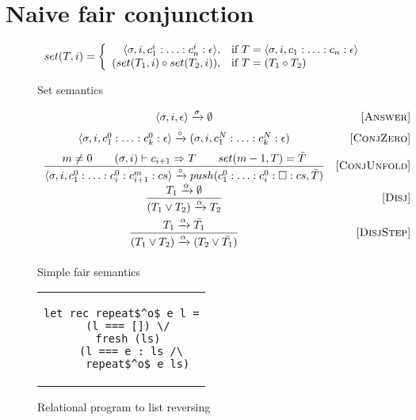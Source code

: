 \section{Naive fair conjunction}

\begin{figure}[h!]
\[
set(T, i) =
\left\{
\begin{array}{rl}
\langle \sigma, i, c_1^i : \ldots : c_n^i : \epsilon \rangle, & \mbox{if } T = \langle \sigma, i, c_1 : \ldots : c_n : \epsilon \rangle \\
(set(T_1, i) \circ set(T_2, i)), & \mbox{if } T = (T_1 \circ T_2)
\end{array}
\right.
\]
\caption{Set semantics}
\label{fair:set-semantics}
\end{figure}

\begin{figure}[h!]
\[\begin{array}{cr}

      {\langle \sigma, i, \epsilon \rangle \xrightarrow{\sigma} \emptyset}  
&     \mbox{[\textsc{Answer}]} \\[2mm]
      {\langle \sigma, i, c_1^0 : \ldots : c_k^0 : \epsilon \rangle \xrightarrow{\circ} (\sigma, i, c_1^N : \ldots : c_k^N : \epsilon)}
&     \mbox{[\textsc{ConjZero}]} \\[2mm]
\dfrac{m \not= 0 \qquad (\sigma, i) \vdash c_{i+1} \Rightarrow T \qquad set(m - 1, T) = \bar{T}}
      {\langle \sigma, i, c_1^0 : \ldots : c_i^0 : c_{i+1}^m : cs \rangle \xrightarrow{\circ} push(c_1^0 : \ldots : c_i^0 : \Box : cs, \bar{T})}
&     \mbox{[\textsc{ConjUnfold}]} \\[2mm]
\dfrac{T_1 \xrightarrow{\alpha} \emptyset}
      {(T_1 \lor T_2) \xrightarrow{\alpha} T_2}
&     \mbox{[\textsc{Disj}]} \\[4mm]
\dfrac{T_1 \xrightarrow{\alpha} \bar{T_1}}
      {(T_1 \lor T_2) \xrightarrow{\alpha} (T_2 \lor\bar{T_1})}
&     \mbox{[\textsc{DisjStep}]} \\[4mm]
\end{array}\]
\caption{Simple fair semantics}
\label{fair:naive-semantics}
\end{figure}

\begin{figure}
\centering
\begin{tabular}{c}
\begin{lstlisting}
let rec repeat$^o$ e l =
  (l === []) \/
  fresh (ls)
    (l === e : ls /\ 
     repeat$^o$ e ls)
\end{lstlisting}
\end{tabular}

\caption{Relational program to list reversing}
\label{fair:lst-repeato}
\end{figure}

\FloatBarrier

